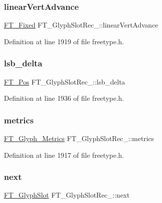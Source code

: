 \subsubsection{\texorpdfstring{linearVertAdvance}{linearVertAdvance}}
{\footnotesize\ttfamily \mbox{\hyperlink{fttypes_8h_a5f5a679cc09f758efdd0d1c5feed3c3d}{F\+T\+\_\+\+Fixed}} F\+T\+\_\+\+Glyph\+Slot\+Rec\+\_\+\+::linear\+Vert\+Advance}



Definition at line 1919 of file freetype.\+h.

\mbox{\label{struct_f_t___glyph_slot_rec___a7d0d8c2eda28e38541e953186ecab89a}} 
\subsubsection{\texorpdfstring{lsb\_delta}{lsb\_delta}}
{\footnotesize\ttfamily \mbox{\hyperlink{ftimage_8h_af5f230f4b253d4c7715fd2e595614c90}{F\+T\+\_\+\+Pos}} F\+T\+\_\+\+Glyph\+Slot\+Rec\+\_\+\+::lsb\+\_\+delta}



Definition at line 1936 of file freetype.\+h.

\mbox{\label{struct_f_t___glyph_slot_rec___abe1ba307281c06a232f50e34c061ce7b}} 
\subsubsection{\texorpdfstring{metrics}{metrics}}
{\footnotesize\ttfamily \mbox{\hyperlink{freetype_8h_aba844698c24c1c12727c60a6fc0a9b3d}{F\+T\+\_\+\+Glyph\+\_\+\+Metrics}} F\+T\+\_\+\+Glyph\+Slot\+Rec\+\_\+\+::metrics}



Definition at line 1917 of file freetype.\+h.

\mbox{\label{struct_f_t___glyph_slot_rec___af339309df5ebe70dfa62a9f4f8838440}} 
\subsubsection{\texorpdfstring{next}{next}}
{\footnotesize\ttfamily \mbox{\hyperlink{freetype_8h_a768daa0d9c3fa499e6c37034ee9f2ca3}{F\+T\+\_\+\+Glyph\+Slot}} F\+T\+\_\+\+Glyph\+Slot\+Rec\+\_\+\+::next}



